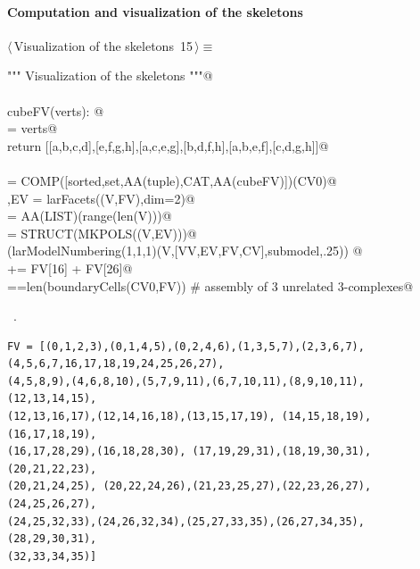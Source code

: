 \documentclass[11pt,oneside]{article}	%
\begin{document}
\paragraph{Computation and visualization of the skeletons}
\begin{flushleft} \small \label{scrap24}
\protect{}$\langle\,$Visualization of the skeletons\nobreak\ {\footnotesize 15}$\,\rangle\equiv$
\vspace{-1ex}
\begin{list}{}{} \item
\mbox{}\verb@""" Visualization of the skeletons """@\\
\mbox{}\verb@@\\
\mbox{}\verb@def cubeFV(verts): @\\
\mbox{}\verb@    [a,b,c,d,  e,f,g,h] = verts@\\
\mbox{}\verb@    return [[a,b,c,d],[e,f,g,h],[a,c,e,g],[b,d,f,h],[a,b,e,f],[c,d,g,h]]@\\
\mbox{}\verb@@\\
\mbox{}\verb@FV = COMP([sorted,set,AA(tuple),CAT,AA(cubeFV)])(CV0)@\\
\mbox{}\verb@V,EV = larFacets((V,FV),dim=2)@\\
\mbox{}\verb@VV = AA(LIST)(range(len(V)))@\\
\mbox{}\verb@submodel = STRUCT(MKPOLS((V,EV)))@\\
\mbox{}\verb@VIEW(larModelNumbering(1,1,1)(V,[VV,EV,FV,CV],submodel,.25)) @\\
\mbox{}\verb@FV[5] += FV[16] + FV[26]@\\
\mbox{}==len(boundaryCells(CV0,FV))  # assembly of 3 unrelated 3-complexes@\\
\mbox{}\verb@@{\NWsep}
\end{list}
\vspace{-1ex}
\footnotesize\addtolength{\baselineskip}{-1ex}
\begin{list}{}{\setlength{\itemsep}{-\parsep}\setlength{\itemindent}{-\leftmargin}}
\item \NWtxtMacroRefIn\ .
\end{list}
\end{flushleft}

\begin{verbatim}
FV = [(0,1,2,3),(0,1,4,5),(0,2,4,6),(1,3,5,7),(2,3,6,7), 
(4,5,6,7,16,17,18,19,24,25,26,27), 
(4,5,8,9),(4,6,8,10),(5,7,9,11),(6,7,10,11),(8,9,10,11), (12,13,14,15),
(12,13,16,17),(12,14,16,18),(13,15,17,19), (14,15,18,19),(16,17,18,19),
(16,17,28,29),(16,18,28,30), (17,19,29,31),(18,19,30,31),(20,21,22,23),
(20,21,24,25), (20,22,24,26),(21,23,25,27),(22,23,26,27),(24,25,26,27), 
(24,25,32,33),(24,26,32,34),(25,27,33,35),(26,27,34,35), (28,29,30,31),
(32,33,34,35)]
\end{verbatim}
\end{document}
